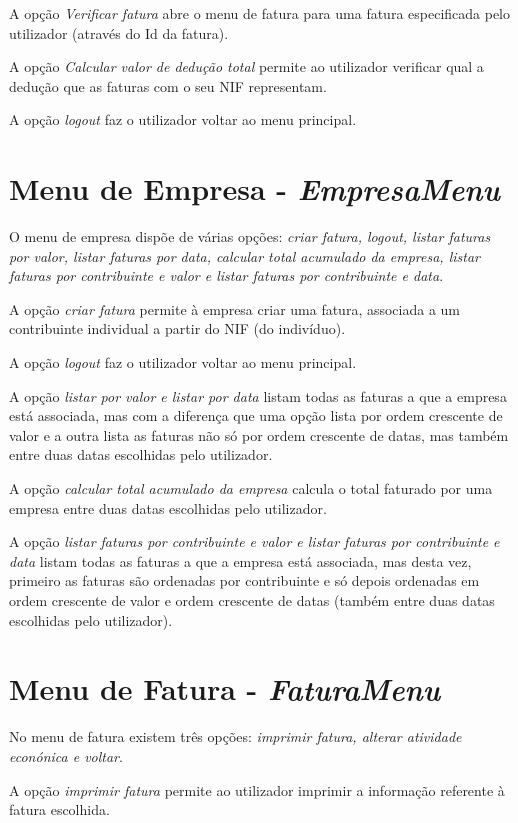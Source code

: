 \documentclass[12pt]{report}
\newcommand\tab[1][0.5cm]{\hspace*{#1}}
\begin{document}
A opção \textit{Verificar fatura} abre o menu de fatura para uma fatura especificada pelo utilizador (através do Id da fatura).

A opção \textit{Calcular valor de dedução total} permite ao utilizador verificar qual a dedução que as faturas com o seu NIF representam.

A opção \textit{logout} faz o utilizador voltar ao menu principal.

\section{Menu de Empresa - \textit{EmpresaMenu}}
\tab O menu de empresa dispõe de várias opções: \textit{criar fatura, logout, listar faturas por valor, listar faturas por data, calcular total acumulado da empresa, listar faturas por contribuinte e valor e listar faturas por contribuinte e data}.

A opção \textit{criar fatura} permite à empresa criar uma fatura, associada a um contribuinte individual a partir do NIF (do indivíduo).

A opção \textit{logout} faz o utilizador voltar ao menu principal.

A opção \textit{listar por valor e listar por data} listam todas as faturas a que a empresa está associada, mas com a diferença que uma opção lista por ordem crescente de valor e a outra lista as faturas não só por ordem crescente de datas, mas também entre duas datas escolhidas pelo utilizador.

A opção \textit{calcular total acumulado da empresa} calcula o total faturado por uma empresa entre duas datas escolhidas pelo utilizador.

A opção \textit{listar faturas por contribuinte e valor e listar faturas por contribuinte e data} listam todas as faturas a que a empresa está associada, mas desta vez, primeiro as faturas são ordenadas por contribuinte e só depois ordenadas em ordem crescente de valor e ordem crescente de datas (também entre duas datas escolhidas pelo utilizador).
\section{Menu de Fatura - \textit{FaturaMenu}}
\tab No menu de fatura existem três opções: \textit{imprimir fatura, alterar atividade econónica e voltar}.

A opção \textit{imprimir fatura} permite ao utilizador imprimir a informação referente à fatura escolhida.
\end{document}
